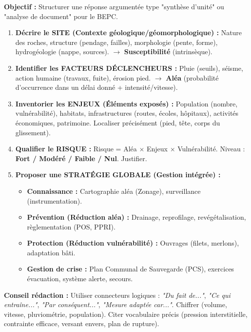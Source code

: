 \documentclass[11pt]{article}
\newcommand{\cle}[1]{{\popxbold\color{popdark}#1}}
\begin{document}
\begin{methode}
    \textbf{Objectif :} Structurer une réponse argumentée type "synthèse d'unité" ou "analyse de document" pour le BEPC.
    \begin{enumerate}
        \item \textbf{Décrire le SITE (Contexte géologique/géomorphologique) :} Nature des roches, structure (pendage, failles), morphologie (pente, forme), hydrogéologie (nappe, sources). $\rightarrow$ \textbf{Susceptibilité} (intrinsèque).
        \item \textbf{Identifier les FACTEURS DÉCLENCHEURS :} Pluie (seuils), séisme, action humaine (travaux, fuite), érosion pied. $\rightarrow$ \textbf{Aléa} (probabilité d'occurrence dans un délai donné + intensité/vitesse).
        \item \textbf{Inventorier les ENJEUX (Éléments exposés) :} Population (nombre, vulnérabilité), habitats, infrastructures (routes, écoles, hôpitaux), activités économiques, patrimoine. Localiser précisément (pied, tête, corps du glissement).
        \item \textbf{Qualifier le RISQUE :} Risque = Aléa $\times$ Enjeux $\times$ Vulnérabilité. Niveau : \textbf{Fort / Modéré / Faible / Nul}. Justifier.
        \item \textbf{Proposer une STRATÉGIE GLOBALE (Gestion intégrée) :}
            \begin{itemize}
                \item \textbf{Connaissance :} Cartographie aléa (Zonage), surveillance (instrumentation).
                \item \textbf{Prévention (Réduction aléa) :} Drainage, reprofilage, revégétalisation, règlementation (POS, PPRI).
                \item \textbf{Protection (Réduction vulnérabilité) :} Ouvrages (filets, merlons), adaptation bâti.
                \item \textbf{Gestion de crise :} Plan Communal de Sauvegarde (PCS), exercices évacuation, système alerte, secours.
            \end{itemize}
    \end{enumerate}
    \textbf{Conseil rédaction :} Utiliser connecteurs logiques : \emph{"Du fait de..."}, \emph{"Ce qui entraîne..."}, \emph{"Par conséquent..."}, \emph{"Mesure adaptée car..."}. Chiffrer (volume, vitesse, pluviométrie, population). Citer vocabulaire précis (\cle{pression interstitielle}, \cle{contrainte efficace}, \cle{versant envers}, \cle{plan de rupture}).
\end{methode}
\end{document}
